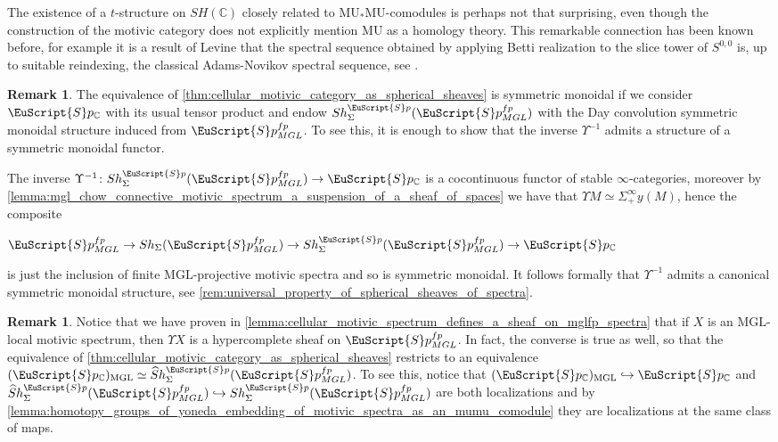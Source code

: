 \documentclass[oneside,a4paper]{amsart}
\newcommand{\euscr}[1]{\EuScript{#1}} %
\newcommand{\MU}{\mathrm{MU}} %
\newcommand{\MGL}{\mathrm{MGL}} %
\newcommand{\spectra}{\euscr{S}p} %
\newcommand{\cspectra}{\euscr{S}p_{\mathbb{C}}} %
\newcommand{\hpsheaves}{\widehat{S}h} %
\newcommand{\spectramglfp}{\spectra_{MGL}^{fp}} %
\newcommand{\hpssheavesofspectra}{\hpsheaves_{\Sigma}^{\spectra}} %
\theoremstyle{plain}
\theoremstyle{definition}
\newtheorem{rem}[thm]{Remark}
\theoremstyle{remark}
\begin{document}
The existence of a $t$-structure on $SH(\mathbb{C})$ closely related to $\MU_{*}\MU$-comodules is perhaps not that surprising, even though the construction of the motivic category does not explicitly mention $\MU$ as a homology theory. This remarkable connection has been known before, for example it is a result of Levine that the spectral sequence obtained by applying Betti realization to the slice tower of $S^{0, 0}$ is, up to suitable reindexing, the classical Adams-Novikov spectral sequence, see \cite{levine2015adams}.

\begin{rem}
\label{rem:equivalence_between_cspectra_and_spherical_sheaves_is_symmetric_monoidal} 
The equivalence of \cref{thm:cellular_motivic_category_as_spherical_sheaves} is symmetric monoidal if we consider $\cspectra$ with its usual tensor product and endow $Sh_{\Sigma}^{\spectra}(\spectramglfp)$ with the Day convolution symmetric monoidal structure induced from $\spectramglfp$. To see this, it is enough to show that the inverse $\Upsilon^{-1}$ admits a structure of a symmetric monoidal functor. 

The inverse $\Upsilon^{-1} \colon Sh_{\Sigma}^{\spectra}(\spectramglfp) \rightarrow \cspectra$ is a cocontinuous functor of stable $\infty$-categories, moreover by \cref{lemma:mgl_chow_connective_motivic_spectrum_a_suspension_of_a_sheaf_of_spaces} we have that $\Upsilon M \simeq \Sigma_{+}^{\infty} y(M)$, hence the composite 

\begin{center}
$\spectramglfp \rightarrow Sh_{\Sigma}(\spectramglfp) \rightarrow Sh_{\Sigma}^{\spectra}(\spectramglfp) \rightarrow \cspectra$
\end{center}
is just the inclusion of finite $\MGL$-projective motivic spectra and so is symmetric monoidal. It follows formally that $\Upsilon^{-1}$ admits a canonical symmetric monoidal structure, see \cref{rem:universal_property_of_spherical_sheaves_of_spectra}. 
\end{rem}

\begin{rem}
\label{rem:hypercompleteness_corresponds_to_mgl_locality_in_cmotivic_cat_as_spherical_sheaves}
Notice that we have proven in \cref{lemma:cellular_motivic_spectrum_defines_a_sheaf_on_mglfp_spectra} that if $X$ is an $\MGL$-local motivic spectrum, then $\Upsilon X$ is a hypercomplete sheaf on $\spectramglfp$. In fact, the converse is true as well, so that the equivalence of \cref{thm:cellular_motivic_category_as_spherical_sheaves} restricts to an equivalence $(\cspectra)_{\MGL} \simeq \hpssheavesofspectra(\spectramglfp)$. To see this, notice that $(\cspectra)_{\MGL} \hookrightarrow \cspectra$ and $\hpssheavesofspectra(\spectramglfp) \hookrightarrow Sh_{\Sigma}^{\spectra}(\spectramglfp)$ are both localizations and by \cref{lemma:homotopy_groups_of_yoneda_embedding_of_motivic_spectra_as_an_mumu_comodule} they are localizations at the same class of maps. 
\end{rem}
\end{document}
